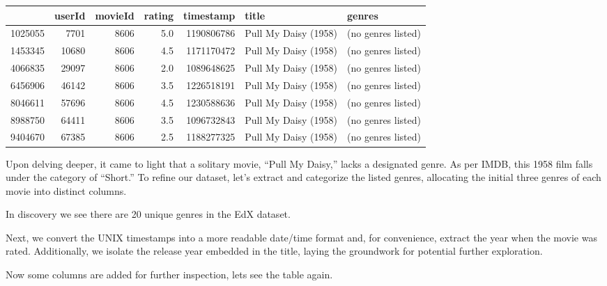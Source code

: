 \documentclass[
]{article}
\begin{document}
\begin{table}[!h]
\centering\begingroup\fontsize{8}{10}\selectfont

\begin{tabular}{l|r|r|r|r|l|l}
\hline
  & userId & movieId & rating & timestamp & title & genres\\
\hline
1025055 & 7701 & 8606 & 5.0 & 1190806786 & Pull My Daisy (1958) & (no genres listed)\\
\hline
1453345 & 10680 & 8606 & 4.5 & 1171170472 & Pull My Daisy (1958) & (no genres listed)\\
\hline
4066835 & 29097 & 8606 & 2.0 & 1089648625 & Pull My Daisy (1958) & (no genres listed)\\
\hline
6456906 & 46142 & 8606 & 3.5 & 1226518191 & Pull My Daisy (1958) & (no genres listed)\\
\hline
8046611 & 57696 & 8606 & 4.5 & 1230588636 & Pull My Daisy (1958) & (no genres listed)\\
\hline
8988750 & 64411 & 8606 & 3.5 & 1096732843 & Pull My Daisy (1958) & (no genres listed)\\
\hline
9404670 & 67385 & 8606 & 2.5 & 1188277325 & Pull My Daisy (1958) & (no genres listed)\\
\hline
\end{tabular}
\endgroup{}
\end{table}

Upon delving deeper, it came to light that a solitary movie, ``Pull My
Daisy,'' lacks a designated genre. As per IMDB, this 1958 film falls
under the category of ``Short.'' To refine our dataset, let's extract
and categorize the listed genres, allocating the initial three genres of
each movie into distinct columns.

In discovery we see there are 20 unique genres in the EdX dataset.

Next, we convert the UNIX timestamps into a more readable date/time
format and, for convenience, extract the year when the movie was rated.
Additionally, we isolate the release year embedded in the title, laying
the groundwork for potential further exploration.

Now some columns are added for further inspection, lets see the table
again.
\end{document}

